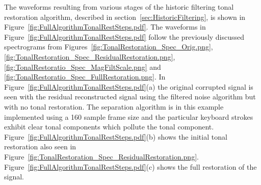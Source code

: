 The waveforms resulting from various stages of the historic filtering tonal restoration algorithm, described in section~\ref{sec:HistoricFiltering}, is shown in Figure~\ref{fig:FullAlgorithmTonalRestSteps.pdf}. The waveforms in Figure~\ref{fig:FullAlgorithmTonalRestSteps.pdf} follow the previously discussed spectrograms from Figures~\ref{fig:TonalRestoration_Spec_Orig.png}, \ref{fig:TonalRestoration_Spec_ResidualRestoration.png}, \ref{fig:TonalRestoratio_Spec_MagFiltScale.png} and \ref{fig:TonalRestoratio_Spec_FullRestoration.png}. In Figure~\ref{fig:FullAlgorithmTonalRestSteps.pdf}(a) the original corrupted signal is seen with the residual reconstructed signal using the filtered noise algorithm but with no tonal restoration. The separation algorithm is in this example implemented using a 160 sample frame size and the particular keyboard strokes exhibit clear tonal components which pollute the tonal component. Figure~\ref{fig:FullAlgorithmTonalRestSteps.pdf}(b) shows the initial tonal restoration also seen in Figure~\ref{fig:TonalRestoration_Spec_ResidualRestoration.png}. Figure~\ref{fig:FullAlgorithmTonalRestSteps.pdf}(c) shows the full restoration of the signal.

